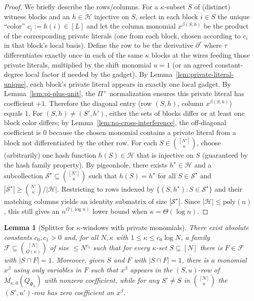 \documentclass[12pt]{article}
\newtheorem{lemma}[theorem]{Lemma}
\theoremstyle{definition}
\theoremstyle{definition}
\theoremstyle{remark}
\theoremstyle{remark}
\begin{document}
\begin{proof}
We briefly describe the rows/columns.
For a $\kappa$-subset $S$ of (distinct) witness blocks and an $h\in\mathcal H$ injective on $S$,
select in each block $i\in S$ the unique ``color'' $c_i:=h(i)\in[L]$ and let the column monomial
$x^{\beta(S,h)}$ be the product of the corresponding private literals (one from each block,
chosen according to $c_i$ in that block's local basis).
Define the row to be the derivative $\partial^\tau$ where $\tau$ differentiates exactly once in
each of the same $\kappa$ blocks at the wires feeding those private literals, multiplied by the shift
monomial $u=1$ (or an agreed constant-degree local factor if needed by the gadget).
By Lemma~\ref{lem:private-literal-unique}, each block's private literal appears in exactly one local gadget.
By Lemma~\ref{lem:pi-plus-unit}, the $\Pi^+$ normalization ensures this private literal has coefficient $+1$.
Therefore the diagonal entry (row $(S,h)$, column $x^{\beta(S,h)}$) equals $1$.
For $(S,h)\neq(S',h')$, either the sets of blocks differ or at least one block color differs;
by Lemma~\ref{lem:no-cross-interference}, the off-diagonal coefficient is $0$ because the chosen monomial
contains a private literal from a block not differentiated by the other row.
For each $S\in\binom{[N']}{\kappa}$, choose (arbitrarily) one hash function $h(S)\in\mathcal H$
that is injective on $S$ (guaranteed by the hash family property).
By pigeonhole, there exists $h^\star\in\mathcal H$ and a subcollection
$\mathcal S^\star\subseteq \binom{[N']}{\kappa}$ such that $h(S)=h^\star$ for all $S\in\mathcal S^\star$
and $|\mathcal S^\star|\ge \binom{N'}{\kappa}/|\mathcal H|$.
Restricting to rows indexed by $\{(S,h^\star):S\in\mathcal S^\star\}$ and their matching columns
yields an identity submatrix of size $|\mathcal S^\star|$.
Since $|\mathcal H|\le \mathrm{poly}(n)$, this still gives an $n^{\Omega(\log n)}$ lower bound
when $\kappa=\Theta(\log n)$.
\end{proof}

\begin{lemma}[Splitter for $\kappa$-windows with private monomials]\label{lem:splitter-appg-duplicate}
There exist absolute constants $c_0,c_1>0$ and, for all $N,\kappa$ with $1\le \kappa\le c_0\log N$, a family
$\mathcal{F}\subseteq {[N] \choose O(\kappa)}$ of size $\le N^{c_1}$ such that for every $\kappa$-set $S\subseteq [N]$
there is $F\in\mathcal{F}$ with $|S\cap F|=1$.
Moreover, given $S$ and $F$ with $|S\cap F|=1$, there is a monomial $x^\beta$ using only variables in $F$
such that $x^\beta$ appears in the $(S,u)$-row of $M_{\kappa,0}(Q_{\Phi_n})$ with nonzero coefficient, while for
any $S'\neq S$ in ${{[N]}\choose \kappa}$ the $(S',u')$-row has zero coefficient on $x^\beta$.
\end{lemma}
\end{document}
